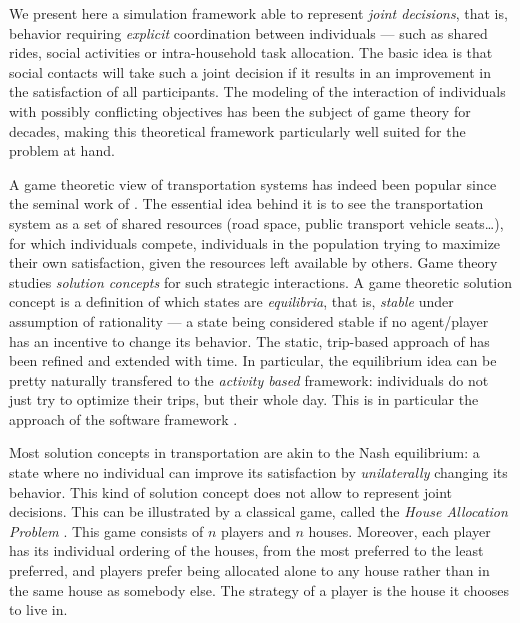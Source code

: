 {

We present here a simulation framework able to represent \emph{joint decisions},
that is, behavior requiring \emph{explicit} coordination between individuals
--- such as shared rides, social activities or intra-household task allocation.
The basic idea is that social contacts will take such a joint decision if it results
in an improvement in the satisfaction of all participants.
The modeling of the interaction of individuals with possibly conflicting objectives
has been the subject of game theory for decades, making this theoretical framework
particularly well suited for the problem at hand.

A game theoretic view of transportation systems has indeed been popular
since the seminal work of
\citeauthor{Wardrop_PICE_1952}
\cite{Wardrop_PICE_1952}.
The essential idea behind it is to see the transportation system as
a set of shared resources (road space, public transport vehicle seats\ldots),
for which individuals compete, individuals in the population trying to maximize
their own satisfaction, given the resources left available by others.
Game theory studies \emph{solution concepts} for such strategic interactions.
A game theoretic solution concept is a definition of which states are
\emph{equilibria}, that is,
\emph{stable} under assumption of rationality
--- a state being considered stable if no agent/player has an incentive
to change its behavior.
%
The static, trip-based approach of
\citeauthor{Wardrop_PICE_1952}
has been refined and extended with time.
In particular, the equilibrium idea can be pretty naturally transfered to
the \emph{activity based} framework:
individuals do not just try to optimize their trips, 
but their whole day.
%
This is in particular the approach of the \matsim software framework
\cite{Axhausen_SSRL_2006,NagelFloetteroed_IATBR_2009}.

Most solution concepts in transportation are akin to the Nash equilibrium:
a state where no individual can improve its satisfaction
by \emph{unilaterally} changing its behavior.
%
This kind of solution concept does not allow to represent joint decisions.
This can be illustrated by a classical game, called the \emph{House Allocation Problem}
\cite{SchummerVohra_NisanEtAl_2007}.
This game consists of $n$ players and $n$ houses. Moreover, each player has its individual
ordering of the houses, from the most preferred to the least preferred,
and players prefer being allocated alone to any house rather than in the
same house as somebody else.
The strategy of a player is the house it chooses to live in.

}

